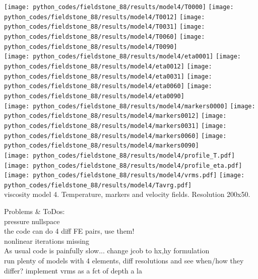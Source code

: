 \begin{center}
\texttt{[image: python\_codes/fieldstone\_88/results/model4/T0000]}
\texttt{[image: python\_codes/fieldstone\_88/results/model4/T0012]}
\texttt{[image: python\_codes/fieldstone\_88/results/model4/T0031]}
\texttt{[image: python\_codes/fieldstone\_88/results/model4/T0060]}
\texttt{[image: python\_codes/fieldstone\_88/results/model4/T0090]}\\
\texttt{[image: python\_codes/fieldstone\_88/results/model4/eta0001]}
\texttt{[image: python\_codes/fieldstone\_88/results/model4/eta0012]}
\texttt{[image: python\_codes/fieldstone\_88/results/model4/eta0031]}
\texttt{[image: python\_codes/fieldstone\_88/results/model4/eta0060]}
\texttt{[image: python\_codes/fieldstone\_88/results/model4/eta0090]}\\
\texttt{[image: python\_codes/fieldstone\_88/results/model4/markers0000]}
\texttt{[image: python\_codes/fieldstone\_88/results/model4/markers0012]}
\texttt{[image: python\_codes/fieldstone\_88/results/model4/markers0031]}
\texttt{[image: python\_codes/fieldstone\_88/results/model4/markers0060]}
\texttt{[image: python\_codes/fieldstone\_88/results/model4/markers0090]}\\
\texttt{[image: python\_codes/fieldstone\_88/results/model4/profile\_T.pdf]}
\texttt{[image: python\_codes/fieldstone\_88/results/model4/profile\_eta.pdf]}
\texttt{[image: python\_codes/fieldstone\_88/results/model4/vrms.pdf]}
\texttt{[image: python\_codes/fieldstone\_88/results/model4/Tavrg.pdf]}\\
{\captionfont viscosity model 4. Temperature, markers and velocity fields. Resolution 200x50.}
\end{center} 







\vspace{2cm}

Problems \& ToDos: \\
pressure nullspace \\
the code can do 4 diff FE pairs, use them!\\
nonlinear iterations missing\\
As usual code is painfully slow...
change jcob to hx,hy formulation\\
run plenty of models with 4 elements, diff resolutions and see when/how they differ?
implement vrms as a fct of depth a la \cite{king15}
